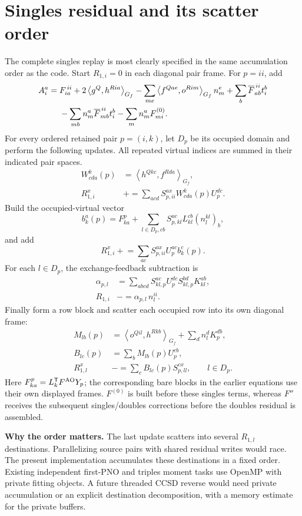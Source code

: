 \documentclass[10pt,letterpaper]{article}
\newcommand{\T}{^{\mathsf T}}
\newcommand{\ip}[2]{\left\langle #1,#2\right\rangle}
\newcommand{\sectionpage}[1]{\newpage\section{#1}}
\begin{document}
\sectionpage{Singles residual and its scatter order}
The complete singles replay is most clearly specified in the same accumulation order as the code. Start $R_{1,i}=0$ in each diagonal pair frame. For $p=ii$, add
\begin{align}
A_i^a={}&F_{ia}^{\,ii}+2\ip{g^Q}{h^{Ria}}_{G_f}
 -\sum_{me}\ip{f^{Qae}}{o^{Rim}}_{G_f}n_m^e
 +\sum_b\overline F_{ab}^{\,ii}t_i^b\notag\\
&-\sum_{mb}n_m^a\overline F_{mb}^{\,ii}t_i^b
 -\sum_m n_m^a F^{(0)}_{mi}.
\end{align}
For every ordered retained pair $p=(i,k)$, let $D_p$ be its occupied domain and perform the following updates. All repeated virtual indices are summed in their indicated pair spaces.
\begin{align}
W^k_{cda}(p)&=\ip{h^{Qkc}}{f^{Rda}}_{G_f},\\
R_{1,i}^{x}&\mathrel{+}=\sum_{ac d}S_{p,ii}^{ax}W^k_{cda}(p)U_p^{dc}.
\end{align}
Build the occupied-virtual vector
\begin{equation}
b_k^a(p)=F_{ka}^{p}+\sum_{l\in D_p,cb}S_{p,kl}^{ac}L_{kl}^{cb}(n_l^{kl})_b,
\end{equation}
and add
\begin{equation}
R_{1,i}^{x}\mathrel{+}=\sum_{ac}S_{p,ii}^{ax}U_p^{ac}b_k^c(p).
\end{equation}
For each $l\in D_p$, the exchange-feedback subtraction is
\begin{align}
\alpha_{p,l}&=\sum_{abcd}S_{kl,p}^{ac}U_p^{dc}S_{kl,p}^{bd}K_{kl}^{ab},\\
R_{1,i}&\mathrel{-}=\alpha_{p,l}\,n_l^{ii}.
\end{align}
Finally form a row block and scatter each occupied row into its own diagonal frame:
\begin{align}
M_{lb}(p)&=\ip{o^{Qil}}{h^{Rkb}}_{G_f}+\sum_d n_l^dK_p^{db},\\
B_{lc}(p)&=\sum_b M_{lb}(p)U_p^{cb},\\
R_{1,l}^{x}&\mathrel{-}=\sum_c B_{lc}(p)S_{p,ll}^{cx},\qquad l\in D_p.
\end{align}
Here $F_{ka}^{p}=L_k\T F^{\rm AO}Y_p$; the corresponding bare blocks in the earlier equations use their own displayed frames. $F^{(0)}$ is built before these singles terms, whereas $F''$ receives the subsequent singles/doubles corrections before the doubles residual is assembled.

\textbf{Why the order matters.} The last update scatters into several $R_{1,l}$ destinations. Parallelizing source pairs with shared residual writes would race. The present implementation accumulates these destinations in a fixed order. Existing independent first-PNO and triples moment tasks use OpenMP with private fitting objects. A future threaded CCSD reverse would need private accumulation or an explicit destination decomposition, with a memory estimate for the private buffers.
\end{document}
